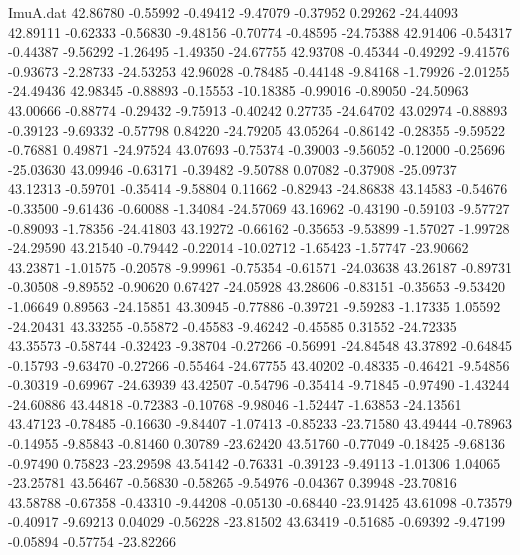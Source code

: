 \begin{filecontents}{ImuA.dat}
  42.86780   -0.55992   -0.49412   -9.47079   -0.37952    0.29262  -24.44093
  42.89111   -0.62333   -0.56830   -9.48156   -0.70774   -0.48595  -24.75388
  42.91406   -0.54317   -0.44387   -9.56292   -1.26495   -1.49350  -24.67755
  42.93708   -0.45344   -0.49292   -9.41576   -0.93673   -2.28733  -24.53253
  42.96028   -0.78485   -0.44148   -9.84168   -1.79926   -2.01255  -24.49436
  42.98345   -0.88893   -0.15553  -10.18385   -0.99016   -0.89050  -24.50963
  43.00666   -0.88774   -0.29432   -9.75913   -0.40242    0.27735  -24.64702
  43.02974   -0.88893   -0.39123   -9.69332   -0.57798    0.84220  -24.79205
  43.05264   -0.86142   -0.28355   -9.59522   -0.76881    0.49871  -24.97524
  43.07693   -0.75374   -0.39003   -9.56052   -0.12000   -0.25696  -25.03630
  43.09946   -0.63171   -0.39482   -9.50788    0.07082   -0.37908  -25.09737
  43.12313   -0.59701   -0.35414   -9.58804    0.11662   -0.82943  -24.86838
  43.14583   -0.54676   -0.33500   -9.61436   -0.60088   -1.34084  -24.57069
  43.16962   -0.43190   -0.59103   -9.57727   -0.89093   -1.78356  -24.41803
  43.19272   -0.66162   -0.35653   -9.53899   -1.57027   -1.99728  -24.29590
  43.21540   -0.79442   -0.22014  -10.02712   -1.65423   -1.57747  -23.90662
  43.23871   -1.01575   -0.20578   -9.99961   -0.75354   -0.61571  -24.03638
  43.26187   -0.89731   -0.30508   -9.89552   -0.90620    0.67427  -24.05928
  43.28606   -0.83151   -0.35653   -9.53420   -1.06649    0.89563  -24.15851
  43.30945   -0.77886   -0.39721   -9.59283   -1.17335    1.05592  -24.20431
  43.33255   -0.55872   -0.45583   -9.46242   -0.45585    0.31552  -24.72335
  43.35573   -0.58744   -0.32423   -9.38704   -0.27266   -0.56991  -24.84548
  43.37892   -0.64845   -0.15793   -9.63470   -0.27266   -0.55464  -24.67755
  43.40202   -0.48335   -0.46421   -9.54856   -0.30319   -0.69967  -24.63939
  43.42507   -0.54796   -0.35414   -9.71845   -0.97490   -1.43244  -24.60886
  43.44818   -0.72383   -0.10768   -9.98046   -1.52447   -1.63853  -24.13561
  43.47123   -0.78485   -0.16630   -9.84407   -1.07413   -0.85233  -23.71580
  43.49444   -0.78963   -0.14955   -9.85843   -0.81460    0.30789  -23.62420
  43.51760   -0.77049   -0.18425   -9.68136   -0.97490    0.75823  -23.29598
  43.54142   -0.76331   -0.39123   -9.49113   -1.01306    1.04065  -23.25781
  43.56467   -0.56830   -0.58265   -9.54976   -0.04367    0.39948  -23.70816
  43.58788   -0.67358   -0.43310   -9.44208   -0.05130   -0.68440  -23.91425
  43.61098   -0.73579   -0.40917   -9.69213    0.04029   -0.56228  -23.81502
  43.63419   -0.51685   -0.69392   -9.47199   -0.05894   -0.57754  -23.82266

\end{filecontents}
